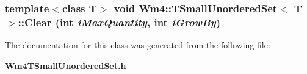 \subsubsection{\setlength{\rightskip}{0pt plus 5cm}template$<$class T$>$ void {\bf Wm4::TSmall\-Unordered\-Set}$<$ T $>$::Clear (int {\em i\-Max\-Quantity}, int {\em i\-Grow\-By})}\label{classWm4_1_1TSmallUnorderedSet_a041a9c43cef7aa6e765c9d15824982d}




The documentation for this class was generated from the following file:\begin{CompactItemize}
\item 
{\bf Wm4TSmall\-Unordered\-Set.h}\end{CompactItemize}

